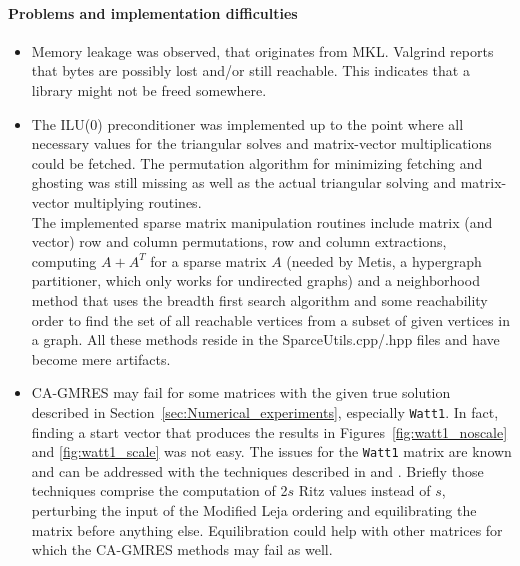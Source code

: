 \documentclass{scrartcl}
\numberwithin{equation}{section}
\begin{document}
\paragraph{Problems and implementation difficulties}
\begin{itemize}
\item Memory leakage was observed, that originates from MKL. Valgrind reports that bytes are possibly lost and/or still reachable. This indicates that a library might not be freed somewhere. 
\item The ILU(0) preconditioner was implemented up to the point where all necessary values for the triangular solves and matrix-vector multiplications could be fetched. The permutation algorithm for minimizing fetching and ghosting was still missing as well as the actual triangular solving and matrix-vector multiplying routines.\\
The implemented sparse matrix manipulation routines include matrix (and vector) row and column permutations, row and column extractions, computing $A + A^T$ for a sparse matrix $A$ (needed by Metis, a hypergraph partitioner, which only works for undirected graphs) and a neighborhood method that uses the breadth first search algorithm and some reachability order to find the set of all reachable vertices from a subset of given vertices in a graph.
All these methods reside in the SparceUtils.cpp/.hpp files and have become mere artifacts.
\item CA-GMRES may fail for some matrices with the given true solution described in Section~\ref{sec:Numerical_experiments}, especially \texttt{Watt1}. In fact, finding a start vector that produces the results in Figures~\ref{fig:watt1_noscale} and \ref{fig:watt1_scale} was not easy. The issues for the \texttt{Watt1} matrix are known and can be addressed with the techniques described in \cite{Erhel95aparallel} and \cite{Hoemmen:2010:CKS:1970638}. Briefly those techniques comprise the computation of 2$s$ Ritz values instead of $s$, perturbing the input of the Modified Leja ordering and equilibrating the matrix before anything else. Equilibration could help with other matrices for which the CA-GMRES methods may fail as well.
\end{itemize}
\end{document}
